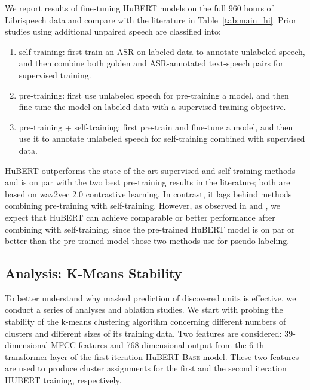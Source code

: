 We report results of fine-tuning HuBERT models on the full 960 hours of Librispeech data and compare with the literature in Table~\ref{tab:main_hi}. Prior studies using additional unpaired speech are classified into:
\begin{enumerate}
    \item self-training: first train an ASR on labeled data to annotate unlabeled speech, and then combine both golden and ASR-annotated text-speech pairs for supervised training.
    \item pre-training: first use unlabeled speech for pre-training a model, and then fine-tune the model on labeled data with a supervised training objective.
    \item pre-training + self-training: first pre-train and fine-tune a model, and then use it to annotate unlabeled speech for self-training combined with supervised data.
\end{enumerate}
HuBERT outperforms the state-of-the-art supervised and self-training methods and is on par with the two best pre-training results in the literature; both are based on wav2vec 2.0 contrastive learning.
In contrast, it lags behind methods combining pre-training with self-training. However, as observed in \cite{xu2020self} and \cite{zhang2020pushing}, we expect that HuBERT can achieve comparable or better performance after combining with self-training, since the pre-trained HuBERT model is on par or better than the pre-trained model those two methods use for pseudo labeling.

\subsection{Analysis: K-Means Stability}
To better understand why masked prediction of discovered units is effective, we conduct a series of analyses and ablation studies. We start with probing the stability of the k-means clustering algorithm concerning different numbers of clusters and different sizes of its training data.
Two features are considered: 39-dimensional MFCC features and 768-dimensional output from the 6-th transformer layer of the first iteration HuBERT-\textsc{Base} model. These two features are used to produce cluster assignments for the first and the second iteration HUBERT training, respectively.

